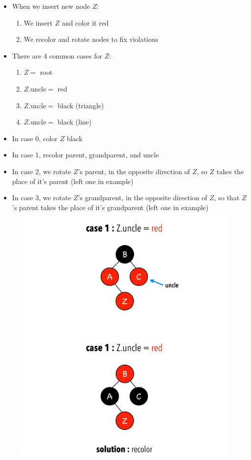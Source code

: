 \documentclass{article}
\begin{document}
\begin{itemize}
\begin{itemize}
        \item When we insert new node $Z$:
        \begin{enumerate}
            \item We insert $Z$ and color it red
            \item We recolor and rotate nodes to fix violations
        \end{enumerate}
        \item There are 4 common cases for $Z$:
        \begin{enumerate}\addtocounter{enumi}{-1}
            \item $Z=$ root
            \item $Z.\text{uncle}=$ red
            \item $Z.\text{uncle}=$ black (triangle)
            \item $Z.\text{uncle}=$ black (line)
        \end{enumerate}
        \item In case 0, color $Z$ black
        \item In case 1, recolor parent, grandparent, and uncle
        \item In case 2, we rotate $Z$'s parent, in the opposite direction of $Z$, so $Z$ takes the place of it's parent (left one in example)
        \item In case 3, we rotate $Z$'s grandparent, in the opposite direction of $Z$, so that $Z$'s parent takes the place of it's grandparent (left one in example)
    \end{itemize}
\end{itemize}

\begin{figure}[H]
    \centering
    \includegraphics[width=0.45\linewidth]{images/rb-case-1-before.jpeg}
    \hfill
    \includegraphics[width=0.45\linewidth]{images/rb-case-1-after.jpeg}
\end{figure}
\end{document}
